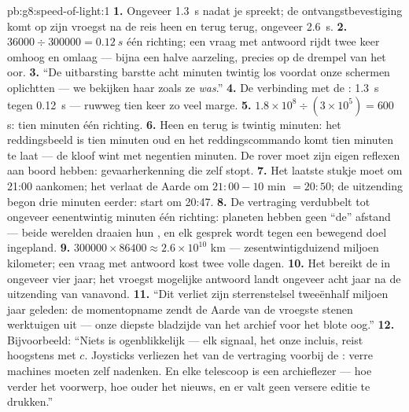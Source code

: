 \begin{solution}{pb:g8:speed-of-light:1}
\textbf{1.} Ongeveer \qty{1.3}{s} nadat je spreekt; de
ontvangstbevestiging komt op zijn vroegst na de reis heen en terug
terug, ongeveer \qty{2.6}{s}.
\textbf{2.} $36000 \div 300000 = \qty{0.12}{s}$ één richting; een vraag
met antwoord rijdt twee keer omhoog en omlaag --- bijna een halve
 aarzeling, precies op de drempel van het oor.
\textbf{3.} ``De uitbarsting barstte acht minuten twintig los voordat
onze schermen oplichtten --- we bekijken haar zoals ze \emph{was}.''
\textbf{4.} De verbinding met de : \qty{1.3}{s} tegen
\qty{0.12}{s} --- ruwweg tien keer zo veel marge.
\textbf{5.} $1.8 \times 10^{8} \div (3 \times 10^{5}) = 600$ s: tien
minuten één richting.
\textbf{6.} Heen en terug is twintig minuten: het reddingsbeeld is tien
minuten oud en het reddingscommando komt tien minuten te laat --- de
kloof wint met negentien minuten. De rover moet zijn eigen reflexen aan
boord hebben: gevaarherkenning die zelf stopt.
\textbf{7.} Het laatste stukje moet om 21:00 aankomen; het verlaat de
Aarde om $21{:}00 - 10$ min $= 20{:}50$; de uitzending begon drie
minuten eerder: start om 20:47.
\textbf{8.} De vertraging verdubbelt tot ongeveer eenentwintig minuten
één richting: planeten hebben geen ``de'' afstand --- beide
werelden draaien hun , en elk gesprek wordt tegen een
bewegend doel ingepland.
\textbf{9.} $300000 \times 86400 \approx 2.6 \times 10^{10}$ km ---
zesentwintigduizend miljoen kilometer; een vraag met antwoord kost twee
volle dagen.
\textbf{10.} Het  bereikt de  in ongeveer vier
jaar; het vroegst mogelijke antwoord landt ongeveer acht jaar na de
uitzending van vanavond.
\textbf{11.} ``Dit  verliet zijn sterrenstelsel tweeënhalf
miljoen jaar geleden: de momentopname zendt de Aarde van de vroegste
stenen werktuigen uit --- onze diepste bladzijde van het archief voor
het blote oog.''
\textbf{12.} Bijvoorbeeld: ``Niets is ogenblikkelijk --- elk signaal,
het onze incluis, reist hoogstens met $c$. Joysticks verliezen het van
de vertraging voorbij de : verre machines moeten zelf
nadenken. En elke telescoop is een archieflezer --- hoe verder het
voorwerp, hoe ouder het nieuws, en er valt geen versere editie te
drukken.''
\end{solution}

